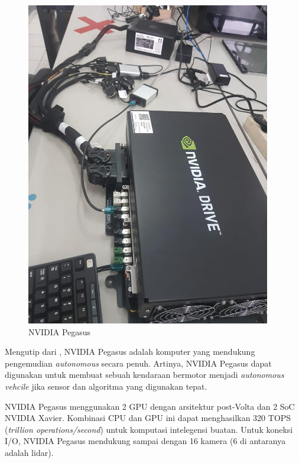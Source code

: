 \begin{figure}
      \begin{center}
            \includegraphics[height=0.5\textheight]{resources/chapter-2/pegasus.png}
            \caption{NVIDIA Pegasus \parencite{trilaksono_laporanRispro}}
      \end{center}
\end{figure}

Mengutip dari \parencite{oh_2017}, NVIDIA Pegasus adalah komputer yang
mendukung pengemudian \textit{autonomous} secara penuh. Artinya, NVIDIA Pegasus
dapat digunakan untuk membuat sebuah kendaraan bermotor menjadi
\textit{autonomous vehcile} jika sensor dan algoritma yang digunakan tepat.

NVIDIA Pegasus menggunakan 2 GPU dengan arsitektur post-Volta dan 2 SoC NVIDIA
Xavier. Kombinasi CPU dan GPU ini dapat menghasilkan 320 TOPS (\textit{trillion
      operations/second}) untuk komputasi intelegensi buatan. Untuk koneksi I/O,
NVIDIA Pegasus mendukung sampai dengan 16 kamera (6 di antaranya adalah lidar).


